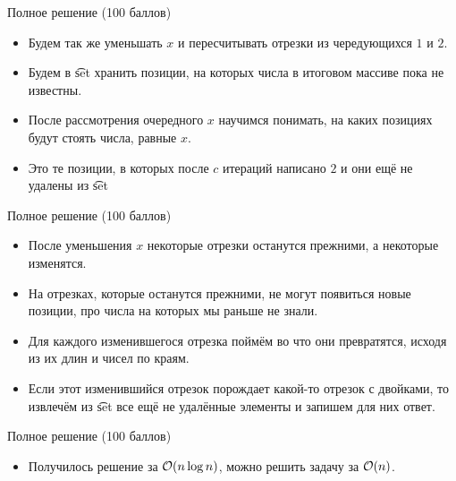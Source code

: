 \begin{frame}{Полное решение (100 баллов)}
  \begin{itemize}
  \item Будем так же уменьшать $x$ и пересчитывать отрезки из чередующихся $1$ и $2$.
  \item Будем в \t{set} хранить позиции, на которых числа в итоговом массиве пока не известны.
  \item После рассмотрения очередного $x$ научимся понимать, на каких позициях будут стоять числа, равные $x$.
  \item Это те позиции, в которых после $c$ итераций написано $2$ и они ещё не удалены из \t{set}
  \end{itemize}
\end{frame}


\begin{frame}{Полное решение (100 баллов)}
  \begin{itemize}
  \item После уменьшения $x$ некоторые отрезки останутся прежними, а некоторые изменятся.
  \item На отрезках, которые останутся прежними, не могут появиться новые позиции, про числа на которых мы раньше не знали.
  \item Для каждого изменившегося отрезка поймём во что они превратятся, исходя из их длин и чисел по краям.
  \item Если этот изменившийся отрезок порождает какой-то отрезок с двойками, то извлечём из \t{set} все ещё не удалённые элементы и запишем для них ответ.
  \end{itemize}
\end{frame}

\begin{frame}{Полное решение (100 баллов)}
  \begin{itemize}
  \item Получилось решение за $\mathcal{O}(n \log n)$, можно решить задачу за $\mathcal{O}(n)$.
  \end{itemize}
\end{frame}


